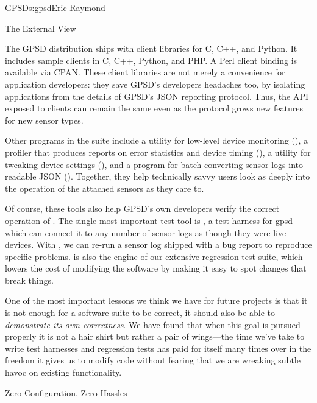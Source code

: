 \begin{aosachapter}{GPSD}{s:gpsd}{Eric Raymond}
\begin{aosasect1}{The External View}

The GPSD distribution ships with client libraries for C, C++, and
Python.  It includes sample clients in C, C++, Python, and PHP. A Perl
client binding is available via CPAN.  These client libraries are not
merely a convenience for application developers: they save GPSD's
developers headaches too, by isolating applications from the details
of GPSD's JSON reporting protocol.  Thus, the API exposed to clients
can remain the same even as the protocol grows new features for new
sensor types.

Other programs in the suite include a utility for low-level device
monitoring (), a profiler that produces reports on error
statistics and device timing (), a utility for tweaking
device settings (), and a program for batch-converting
sensor logs into readable JSON (). Together, they help
technically savvy users look as deeply into the operation of the
attached sensors as they care to.

Of course, these tools also help GPSD's own developers verify the
correct operation of . The single most important test tool
is , a test harness for gpsd which can connect it to any
number of sensor logs as though they were live devices.  With
, we can re-run a sensor log shipped with a bug report
to reproduce specific problems.   is also the engine of
our extensive regression-test suite, which lowers the cost of
modifying the software by making it easy to spot changes that break
things.

One of the most important lessons we think we have for future projects
is that it is not enough for a software suite to be correct, it should
also be able to \emph{demonstrate its own correctness}.  We have found that
when this goal is pursued properly it is not a hair shirt but rather a
pair of wings---the time we've take to write test harnesses and
regression tests has paid for itself many times over in the freedom
it gives us to modify code without fearing that we are wreaking
subtle havoc on existing functionality.


\end{aosasect1}

\begin{aosasect1}{Zero Configuration, Zero Hassles}


\end{aosasect1}
\end{aosachapter}
